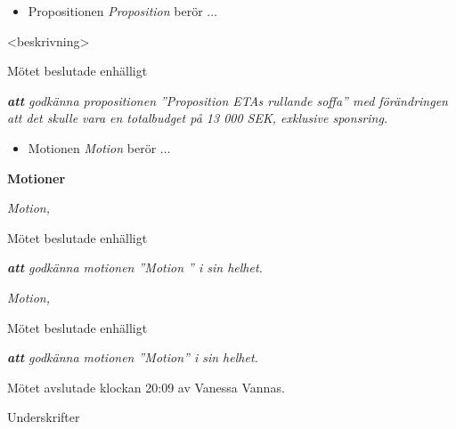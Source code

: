 \begin{itemize}

    \item Propositionen \emph{Proposition } berör ...

\end{itemize}

<beskrivning>

Mötet beslutade enhälligt

\emph{\textbf{att} godkänna propositionen  ''Proposition ETAs rullande soffa'' med förändringen att det skulle vara en totalbudget på 13 000 SEK, exklusive sponsring.}



\sect[Motioner]


\begin{itemize}

    \item Motionen \emph{Motion } berör ...

\end{itemize}






\newpage
\textbf{Motioner}

    \emph{Motion,}
 
    Mötet beslutade enhälligt
    
    \emph{\textbf{att} godkänna motionen ''Motion '' i sin helhet.}
    
    \vspace{0.2in}
    
    \emph{Motion, }
    
    Mötet beslutade enhälligt
    
    \emph{\textbf{att} godkänna motionen ''Motion'' i sin helhet.}

    \vspace{0.2in}

  

   
Mötet avslutade klockan 20:09 av Vanessa Vannas.


\newpage
\cleardoublepage
\pagebreak
\dagordning

\newpage
Underskrifter


